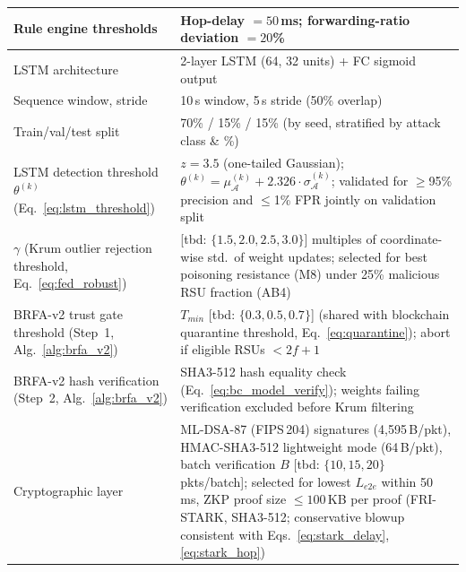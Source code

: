 \documentclass[12pt, a4paper]{report}
\begin{document}
{{\begin{longtable}{|m{5.0cm}|m{9.0cm}|}
            \hline
            Rule engine thresholds & Hop-delay $= 50$\,ms; forwarding-ratio deviation $= 20$\% \\
            \hline
            LSTM architecture & 2-layer LSTM (64, 32 units) + FC sigmoid output \\
            \hline
            Sequence window, stride & 10\,s window, 5\,s stride (50\% overlap) \\
            \hline
            Train/val/test split & 70\% / 15\% / 15\% (by seed, stratified by attack class \& \%) \\
            \hline
            LSTM detection threshold $\theta^{(k)}$ (Eq.~\ref{eq:lstm_threshold}) &
            $z = 3.5$ (one-tailed Gaussian); $\theta^{(k)} = \mu_{\mathcal{A}}^{(k)} + 2.326 \cdot \sigma_{\mathcal{A}}^{(k)}$;
            validated for $\geq$95\% precision and $\leq$1\% FPR jointly on validation split \\           
            \hline
              $\gamma$ (Krum outlier rejection threshold, Eq.~\ref{eq:fed_robust}) & [tbd: $\{1.5, 2.0, 2.5, 3.0\}$] multiples of coordinate-wise std.\ of weight updates;   selected for best poisoning resistance (M8) under 25\% malicious RSU fraction (AB4) \\
            \hline
              BRFA-v2 trust gate threshold (Step~1, Alg.~\ref{alg:brfa_v2}) &              $T_{min}$ [tbd: $\{0.3, 0.5, 0.7\}$] (shared with blockchain quarantine threshold, Eq.~\ref{eq:quarantine}); abort if eligible RSUs $< 2f{+}1$ \\
             \hline
              BRFA-v2 hash verification (Step~2, Alg.~\ref{alg:brfa_v2}) &              SHA3-512 hash equality check (Eq.~\ref{eq:bc_model_verify}); weights failing
              verification excluded before Krum filtering \\
              \hline
            Cryptographic layer & ML-DSA-87 (FIPS\,204) signatures (4,595\,B/pkt),
            HMAC-SHA3-512 lightweight mode (64\,B/pkt),
            batch verification $B$ [tbd: $\{10, 15, 20\}$\,pkts/batch];
            selected for lowest $L_{e2e}$ within 50\,ms,  ZKP proof size  $\leq 100$\,KB per proof   (FRI-STARK, SHA3-512; conservative blowup
             consistent with Eqs.~\ref{eq:stark_delay},
            \ref{eq:stark_hop}) \\


\end{longtable}}}
\end{document}
